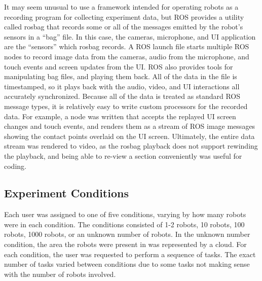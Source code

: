 It may seem unusual to use a framework intended for operating robots as a recording program for collecting experiment data, but ROS provides a utility called rosbag that records some or all of the messages emitted by the robot's sensors in a ``bag'' file. 
In this case, the cameras, microphone, and UI application are the ``sensors'' which rosbag records.
A ROS launch file starts multiple ROS nodes to record image data from the cameras, audio from the microphone, and touch events and screen updates from the UI.
ROS also provides tools for manipulating bag files, and playing them back. 
All of the data in the file is timestamped, so it plays back with the audio, video, and UI interactions all accurately synchronized. 
Because all of the data is treated as standard ROS message types, it is relatively easy to write custom processors for the recorded data.
For example, a node was written that accepts the replayed UI screen changes and touch events, and renders them as a stream of ROS image messages showing the contact points overlaid on the UI screen. 
Ultimately, the entire data stream was rendered to video, as the rosbag playback does not support rewinding the playback, and being able to re-view a section conveniently was useful for coding. 

\subsection{Experiment Conditions} \label{section:Experiment_Conditions}

Each user was assigned to one of five conditions, varying by how many robots were in each condition. 
The conditions consisted of 1-2 robots, 10 robots, 100 robots, 1000 robots, or an unknown number of robots.
In the unknown number condition, the area the robots were present in was represented by a cloud. 
For each condition, the user was requested to perform a sequence of tasks. 
The exact number of tasks varied between conditions due to some tasks not making sense with the number of robots involved. 

